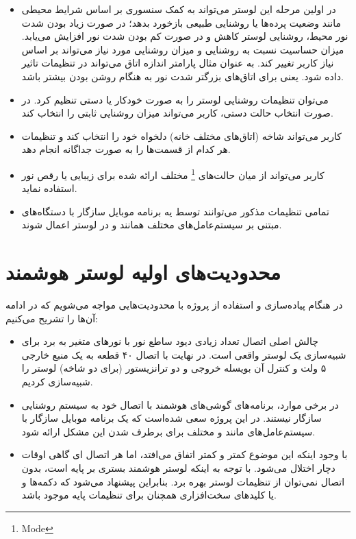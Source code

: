 \documentclass[12pt,a4paper]{article}
\begin{document}
	\begin{itemize}
		\item
		در اولین مرحله این لوستر می‌تواند به کمک سنسوری بر اساس شرایط محیطی مانند وضعیت پرده‌ها یا روشنایی طبیعی بازخورد بدهد؛ در صورت زیاد بودن شدت نور محیط، روشنایی لوستر کاهش و در صورت کم بودن شدت نور افزایش می‌یابد. میزان حساسیت نسبت به روشنایی و میزان روشنایی مورد نیاز می‌تواند بر اساس نیاز کاربر تغییر کند. به عنوان مثال پارامتر‌ اندازه اتاق می‌تواند در تنظیمات تاثیر داده شود. یعنی برای اتاق‌های بزرگتر شدت نور به هنگام روشن بودن بیشتر باشد. 
		\item
		می‌توان تنظیمات روشنایی لوستر را به صورت خودکار یا دستی تنظیم کرد. در صورت انتخاب حالت دستی، کاربر می‌تواند میزان روشنایی ثابتی را انتخاب کند.
		\item
		کاربر می‌تواند شاخه (اتاق‌های مختلف خانه) دلخواه خود را انتخاب کند و تنظیمات هر کدام از قسمت‌ها را به صورت جداگانه انجام دهد.
		\item
		کاربر می‌تواند از میان حالت‌های‌ \footnote{Mode} مختلف ارائه شده برای زیبایی یا رقص نور استفاده نماید.
		\item
		تمامی تنظیمات مذکور می‌توانند توسط یه برنامه موبایل سازگار با دستگاه‌های مبتنی بر سیستم‌عامل‌های مختلف همانند  و  در لوستر اعمال شوند.
	\end{itemize}
	
	\section{محدودیت‌های اولیه لوستر هوشمند}
	
	در هنگام پیاده‌سازی و استفاده از پروژه با محدودیت‌هایی مواجه می‌شویم که در ادامه آن‌ها را تشریح می‌کنیم:
	
	\begin{itemize}
		\item
		چالش اصلی اتصال تعداد زیادی دیود ساطع نور  با نورهای متغیر به برد برای شبیه‌سازی یک لوستر واقعی است. در نهایت با اتصال ۴۰ قطعه  به یک منبع خارجی ۵ ولت و کنترل آن بویسله خروجی  و دو ترانزیستور (برای دو شاخه) لوستر را شبیه‌سازی کردیم.
		\item
		در برخی موارد، برنامه‌های گوشی‌های هوشمند با اتصال خود به سیستم روشنایی سازگار نیستند. در این پروژه سعی شده‌است که یک برنامه موبایل سازگار با سیستم‌عامل‌های مانند و  مختلف برای برطرف شدن این مشکل ارائه شود.
		\item
		با وجود اینکه این موضوع کمتر و کمتر اتفاق می‌افتد، اما هر اتصال ‌ای گاهی اوقات دچار اختلال می‌شود. با توجه به اینکه لوستر هوشمند بستری بر پایه  است، بدون اتصال  نمی‌توان از تنظیمات لوستر بهره برد. بنابراین پیشنهاد می‌شود که دکمه‌ها و یا کلید‌های سخت‌افزاری همچنان برای تنظیمات پایه‌ موجود باشد.
	\end{itemize}
	
\end{document}
